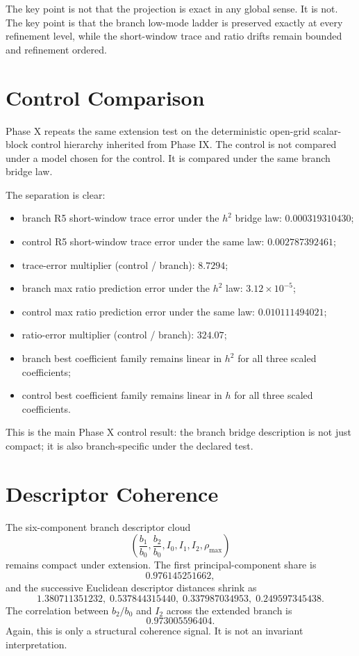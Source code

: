 \documentclass[11pt]{article}
\begin{document}
The key point is not that the projection is exact in any global sense. It is not. The key point is that the branch low-mode ladder is preserved exactly at every refinement level, while the short-window trace and ratio drifts remain bounded and refinement ordered.

\section{Control Comparison}

Phase X repeats the same extension test on the deterministic open-grid scalar-block control hierarchy inherited from Phase IX. The control is not compared under a model chosen for the control. It is compared under the same branch bridge law.

The separation is clear:
\begin{itemize}
\item branch R5 short-window trace error under the $h^2$ bridge law: $0.000319310430$;
\item control R5 short-window trace error under the same law: $0.002787392461$;
\item trace-error multiplier (control / branch): $8.7294$;
\item branch max ratio prediction error under the $h^2$ law: $3.12 \times 10^{-5}$;
\item control max ratio prediction error under the same law: $0.010111494021$;
\item ratio-error multiplier (control / branch): $324.07$;
\item branch best coefficient family remains linear in $h^2$ for all three scaled coefficients;
\item control best coefficient family remains linear in $h$ for all three scaled coefficients.
\end{itemize}

This is the main Phase X control result: the branch bridge description is not just compact; it is also branch-specific under the declared test.

\section{Descriptor Coherence}

The six-component branch descriptor cloud
\[
\left(\frac{b_1}{b_0}, \frac{b_2}{b_0}, I_0, I_1, I_2, \rho_{\max}\right)
\]
remains compact under extension. The first principal-component share is
\[
0.976145251662,
\]
and the successive Euclidean descriptor distances shrink as
\[
1.380711351232,\;0.537844315440,\;0.337987034953,\;0.249597345438.
\]
The correlation between $b_2/b_0$ and $I_2$ across the extended branch is
\[
0.973005596404.
\]
Again, this is only a structural coherence signal. It is not an invariant interpretation.
\end{document}
